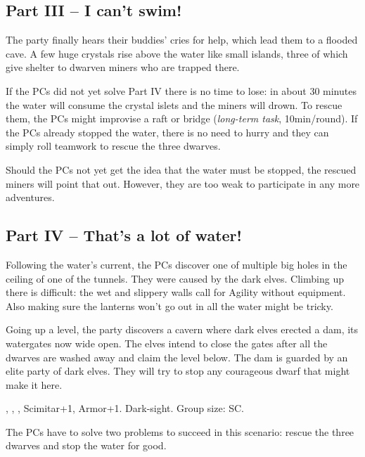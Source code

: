 {		\subsection{Part III -- I can't swim!}

		The party finally hears their buddies' cries for help, which lead them to a flooded cave. A few huge crystals rise above the water like small islands, three of which give shelter to dwarven miners who are trapped there.

		If the PCs did not yet solve Part IV there is no time to lose: in about 30 minutes the water will consume the crystal islets and the miners will drown. To rescue them, the PCs might improvise a raft or bridge (\emph{long-term task}, 10min/round). If the PCs already stopped the water, there is no need to hurry and they can simply roll teamwork to rescue the three dwarves.

		Should the PCs not yet get the idea that the water must be stopped, the rescued miners will point that out. However, they are too weak to participate in any more adventures.

		\subsection{Part IV -- That's a lot of water!}

		Following the water's current, the PCs discover one of multiple big holes in the ceiling of one of the tunnels. They were caused by the dark elves. Climbing up there is difficult: the wet and slippery walls call for Agility without equipment. Also making sure the lanterns won't go out in all the water might be tricky.

		Going up a level, the party discovers a cavern where dark elves erected a dam, its watergates now wide open. The elves intend to close the gates after all the dwarves are washed away and claim the level below. The dam is guarded by an elite party of dark elves. They will try to stop any courageous dwarf that might make it here.

		 , , , Scimitar+1, Armor+1. Dark-sight. Group size: SC.


		\noindent
		The PCs have to solve two problems to succeed in this scenario: rescue the three dwarves and stop the water for good.
}
